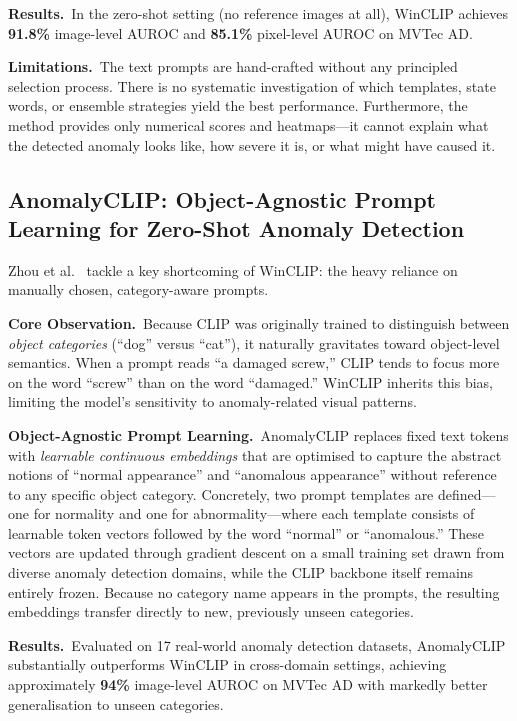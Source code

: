 \documentclass[conference]{IEEEtran}
\begin{document}
\textbf{Results.}\ In the zero-shot setting (no reference images at all), WinCLIP achieves \textbf{91.8\%} image-level AUROC and \textbf{85.1\%} pixel-level AUROC on MVTec AD.

\textbf{Limitations.}\ The text prompts are hand-crafted without any principled selection process. There is no systematic investigation of which templates, state words, or ensemble strategies yield the best performance. Furthermore, the method provides only numerical scores and heatmaps---it cannot explain what the detected anomaly looks like, how severe it is, or what might have caused it.

\subsection{AnomalyCLIP: Object-Agnostic Prompt Learning for Zero-Shot Anomaly Detection}

Zhou et al.~\cite{zhou2024anomalyclip} tackle a key shortcoming of WinCLIP: the heavy reliance on manually chosen, category-aware prompts.

\textbf{Core Observation.}\ Because CLIP was originally trained to distinguish between \textit{object categories} (``dog'' versus ``cat''), it naturally gravitates toward object-level semantics. When a prompt reads ``a damaged screw,'' CLIP tends to focus more on the word ``screw'' than on the word ``damaged.'' WinCLIP inherits this bias, limiting the model's sensitivity to anomaly-related visual patterns.

\textbf{Object-Agnostic Prompt Learning.}\ AnomalyCLIP replaces fixed text tokens with \textit{learnable continuous embeddings} that are optimised to capture the abstract notions of ``normal appearance'' and ``anomalous appearance'' without reference to any specific object category. Concretely, two prompt templates are defined---one for normality and one for abnormality---where each template consists of learnable token vectors followed by the word ``normal'' or ``anomalous.'' These vectors are updated through gradient descent on a small training set drawn from diverse anomaly detection domains, while the CLIP backbone itself remains entirely frozen. Because no category name appears in the prompts, the resulting embeddings transfer directly to new, previously unseen categories.

\textbf{Results.}\ Evaluated on 17 real-world anomaly detection datasets, AnomalyCLIP substantially outperforms WinCLIP in cross-domain settings, achieving approximately \textbf{94\%} image-level AUROC on MVTec AD with markedly better generalisation to unseen categories.
\end{document}
